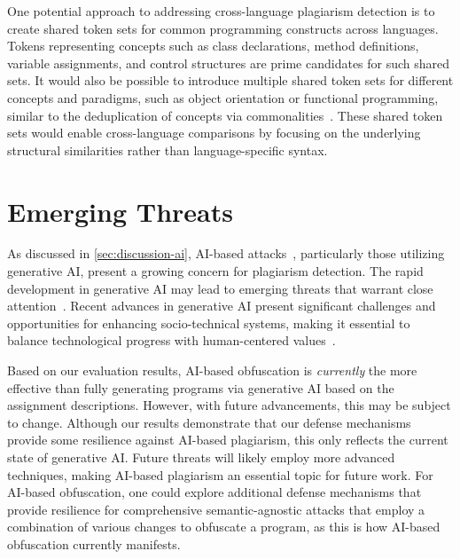 One potential approach to addressing cross-language plagiarism detection is to create shared token sets for common programming constructs across languages.
Tokens representing concepts such as class declarations, method definitions, variable assignments, and control structures are prime candidates for such shared sets. 
It would also be possible to introduce multiple shared token sets for different concepts and paradigms, such as object orientation or functional programming, similar to the deduplication of concepts via commonalities~\cite{Klare2019}. These shared token sets would enable cross-language comparisons by focusing on the underlying structural similarities rather than language-specific syntax.


\section{Emerging Threats}
As discussed in \autoref{sec:discussion-ai}, AI-based attacks~\cite{Biderman2022}, particularly those utilizing generative AI, present a growing concern for plagiarism detection.
The rapid development in generative AI may lead to emerging threats that warrant close attention~\cite{Lancaster2023}.
Recent advances in generative AI present significant challenges and opportunities for enhancing socio-technical systems, making it essential to balance technological progress with human-centered values~\cite{Boltz2024}.

Based on our evaluation results, AI-based obfuscation is \textit{currently} the more effective than fully generating programs via generative AI based on the assignment descriptions. However, with future advancements, this may be subject to change.
Although our results demonstrate that our defense mechanisms provide some resilience against AI-based plagiarism, this only reflects the current state of generative AI.
Future threats will likely employ more advanced techniques, making AI-based plagiarism an essential topic for future work.
For AI-based obfuscation, one could explore additional defense mechanisms that provide resilience for comprehensive semantic-agnostic attacks that employ a combination of various changes to obfuscate a program, as this is how AI-based obfuscation currently manifests.


